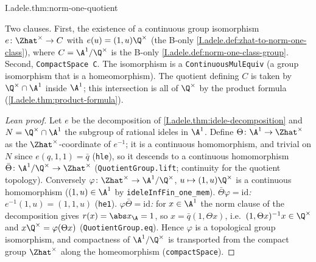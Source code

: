\begin{theorem}
\end{theorem}
\begin{tfformal}{I.adele.thm:norm-one-quotient}
\begin{tffidelity}
Two clauses. First, the existence of a continuous group isomorphism $e\colon\Zhat^\times\to C$ with $e(u)=(1,u)\Q^\times$ (the B-only \cref{I.adele.def:zhat-to-norm-one-class}), where $C=\A^1/\Q^\times$ is the B-only \cref{I.adele.def:norm-one-class-group}. Second, \texttt{CompactSpace C}. The isomorphism is a \texttt{ContinuousMulEquiv} (a group isomorphism that is a homeomorphism). The quotient defining $C$ is taken by $\Q^\times\cap\A^1$ inside $\A^1$; this intersection is all of $\Q^\times$ by the product formula (\cref{I.adele.thm:product-formula}).
\end{tffidelity}
\end{tfformal}
\begin{proof}[Lean proof]
Let $e$ be the decomposition of \cref{I.adele.thm:idele-decomposition} and $N=\Q^\times\cap\A^1$ the subgroup of rational ideles in $\A^1$. Define $\Theta\colon\A^1\to\Zhat^\times$ as the $\Zhat^\times$-coordinate of $e^{-1}$; it is a continuous homomorphism, and trivial on $N$ since $e(q,1,1)=\bar q$ (\texttt{hle}), so it descends to a continuous homomorphism $\bar\Theta\colon\A^1/\Q^\times\to\Zhat^\times$ (\texttt{QuotientGroup.lift}; continuity for the quotient topology). Conversely $\varphi\colon\Zhat^\times\to\A^1/\Q^\times$, $u\mapsto(1,u)\Q^\times$ is a continuous homomorphism ($(1,u)\in\A^1$ by \texttt{ideleInfFin\_one\_mem}). \emph{$\bar\Theta\varphi=\mathrm{id}$:} $e^{-1}(1,u)=(1,1,u)$ (\texttt{he1}). \emph{$\varphi\bar\Theta=\mathrm{id}$:} for $x\in\A^1$ the norm clause of the decomposition gives $r(x)=\abs x_\A=1$, so $x=\bar q(1,\Theta x)$, i.e.\ $(1,\Theta x)^{-1}x\in\Q^\times$ and $x\Q^\times=\varphi(\Theta x)$ (\texttt{QuotientGroup.eq}). Hence $\varphi$ is a topological group isomorphism, and compactness of $\A^1/\Q^\times$ is transported from the compact group $\Zhat^\times$ along the homeomorphism (\texttt{compactSpace}).
\end{proof}

